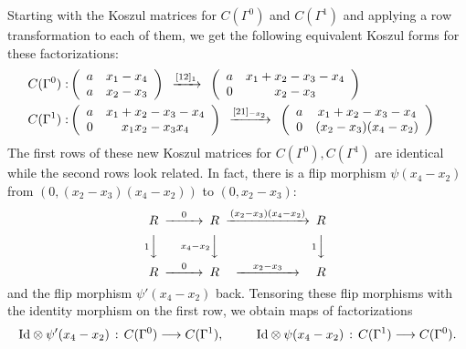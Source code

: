\documentclass[12pt]{article}
\begin{document}
Starting with the Koszul matrices for $C(\Gamma^0)$ and 
$C(\Gamma^1)$ and 
applying a row transformation to each of them, we get the 
following equivalent Koszul forms for these factorizations: 
\begin{eqnarray} 
C(\Gamma^0): &  \label{fla-gam-n}
\left( \begin{array}{cc} a & x_1-x_4 \\ a & x_2 -x_3 \end{array} 
   \right)\hspace{0.06in} \xrightarrow{[12]_1} \hspace{0.06in} 
  \left( \begin{array}{cc} a & x_1+x_2-x_3-x_4 \\ 0 & x_2 -x_3 \end{array} 
   \right) &   \\
 C(\Gamma^1): & \label{fla-gam-o}  
\left( \begin{array}{cc} a & x_1+x_2-x_3-x_4 \\ 0 & x_1x_2-x_3x_4 \end{array} 
   \right)\hspace{0.06in} \xrightarrow{[21]_{-x_2}} \hspace{0.06in} 
  \left( \begin{array}{cc} a & x_1+x_2-x_3-x_4 \\ 0 & (x_2 -x_3)(x_4-x_2) 
  \end{array} 
   \right) & 
\end{eqnarray} 
The first rows of these new Koszul matrices for $C(\Gamma^0), C(\Gamma^1)$ 
are identical while the second rows look related. In fact, there is a 
flip morphism $\psi(x_4-x_2)$ from $(0,(x_2 -x_3)(x_4-x_2))$ to 
$(0, x_2 -x_3)$: 
  \begin{equation*}
   \begin{CD}
     R @>{0}>> R @>{(x_2-x_3)(x_4-x_2)}>> R  \\
     @V{1}VV      @V{x_4-x_2}VV   @V{1}VV \\
     R @>{0}>> R @>{\quad  x_2-x_3 \quad }>> R
   \end{CD}
 \end{equation*}
and the flip morphism $\psi'(x_4-x_2)$ back. Tensoring these flip 
morphisms with the identity morphism on the first row, we obtain 
maps of factorizations 
$$ \mathrm{Id}\otimes \psi'(x_4-x_2)\hspace{0.02in} : \hspace{0.02in} 
  C(\Gamma^0)\longrightarrow C(\Gamma^1), \hspace{0.35in} 
   \mathrm{Id}\otimes \psi(x_4-x_2)\hspace{0.02in} : \hspace{0.02in} 
  C(\Gamma^1)\longrightarrow C(\Gamma^0). $$
\end{document}
